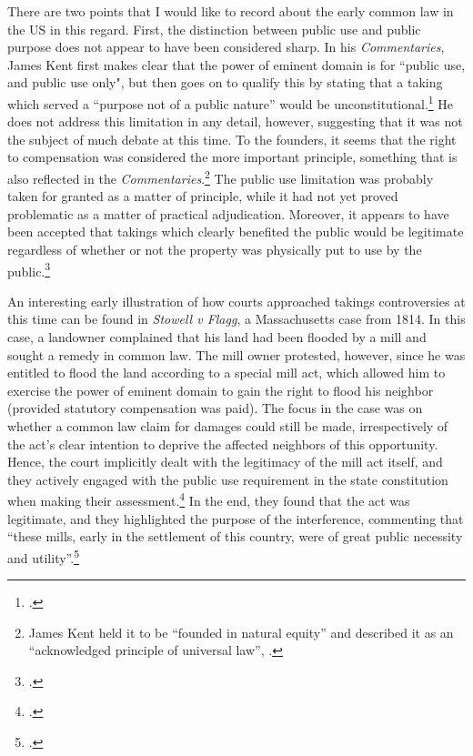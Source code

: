 There are two points that I would like to record about the early common law in the US  in this regard. First, the distinction between public use and public purpose does not appear to have been considered sharp. In his {\it Commentaries}, James Kent first makes clear that the power of eminent domain is for ``public use, and public use only", but then goes on to qualify this by stating that a taking which served a ``purpose not of a public nature'' would be unconstitutional.\footcite[See][275-276]{kent27}  He does not address this limitation in any detail, however, suggesting that it was not the subject of much debate at this time. To the founders, it seems that the right to compensation was considered the more important principle, something that is also reflected in the {\it Commentaries}.\footnote{James Kent held it to be  ``founded in natural equity'' and described it as an ``acknowledged principle of universal law'', \cite[see][276]{kent27}.} The public use limitation was probably taken for granted as a matter of principle, while it had not yet proved problematic as a matter of practical adjudication. Moreover, it appears to have been accepted that takings which clearly benefited the public would be legitimate regardless of whether or not the property was physically put to use by the public.\footcite{johnson11}

An interesting early illustration of how courts approached takings controversies at this time can be found in {\it Stowell v Flagg}, a Massachusetts case from 1814. In this case, a landowner complained that his land had been flooded by a mill and sought a remedy in common law. The mill owner protested, however, since he was entitled to flood the land according to a special mill act, which allowed him to exercise the power of eminent domain to gain the right to flood his neighbor (provided statutory compensation was paid). The focus in the case was on whether a common law claim for damages could still be made, irrespectively of the act's clear intention to deprive the affected neighbors of this opportunity. Hence, the court implicitly dealt with the legitimacy of the mill act itself, and they actively engaged with the public use requirement in the state constitution when making their assessment.\footcite{stowell14} In the end, they found that the act was legitimate, and they highlighted the purpose of the interference, commenting that ``these mills, early in the settlement of this country, were of great public necessity and utility''.\footcite[366]{stowell14} 

